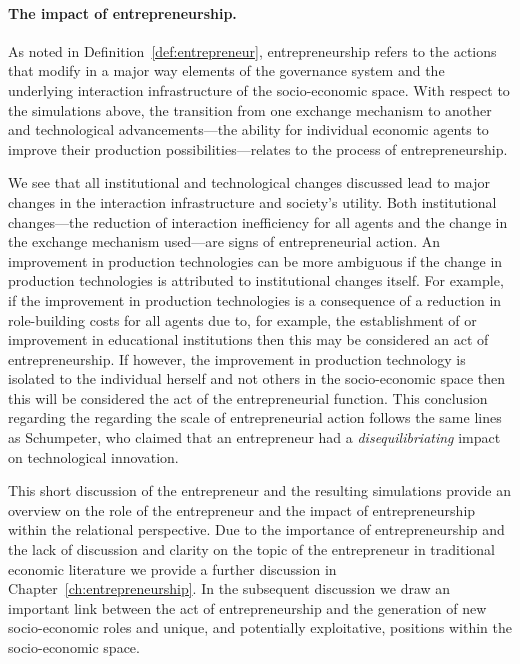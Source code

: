 \paragraph{The impact of entrepreneurship.}
\label{par:the_impact_of_entrepreneurship_}

As noted in Definition~\ref{def:entrepreneur}, entrepreneurship refers to the actions that modify in a major way elements of the governance system and the underlying interaction infrastructure of the socio-economic space. With respect to the simulations above, the transition from one exchange mechanism to another and technological advancements---the ability for individual economic agents to improve their production possibilities---relates to the process of entrepreneurship. 

We see that all institutional and technological changes discussed lead to major changes in the interaction infrastructure and society's utility. Both institutional changes---the reduction of interaction inefficiency for all agents and the change in the exchange mechanism used---are signs of entrepreneurial action. An improvement in production technologies can be more ambiguous if the change in production technologies is attributed to institutional changes itself. For example, if the improvement in production technologies is a consequence of a reduction in role-building costs for all agents due to, for example, the establishment of or improvement in educational institutions then this may be considered an act of entrepreneurship. If however, the improvement in production technology is isolated to the individual herself and not others in the socio-economic space then this will be considered the act of the entrepreneurial function. This conclusion regarding the regarding the scale of entrepreneurial action follows the same lines as Schumpeter, who claimed that an entrepreneur had a \emph{disequilibriating} impact on technological innovation. 

This short discussion of the entrepreneur and the resulting simulations provide an overview on the role of the entrepreneur and the impact of entrepreneurship within the relational perspective. Due to the importance of entrepreneurship and the lack of discussion and clarity on the topic of the entrepreneur in traditional economic literature we provide a further discussion in Chapter~\ref{ch:entrepreneurship}. In the subsequent discussion we draw an important link between the act of entrepreneurship and the generation of new socio-economic roles and unique, and potentially exploitative, positions within the socio-economic space.
